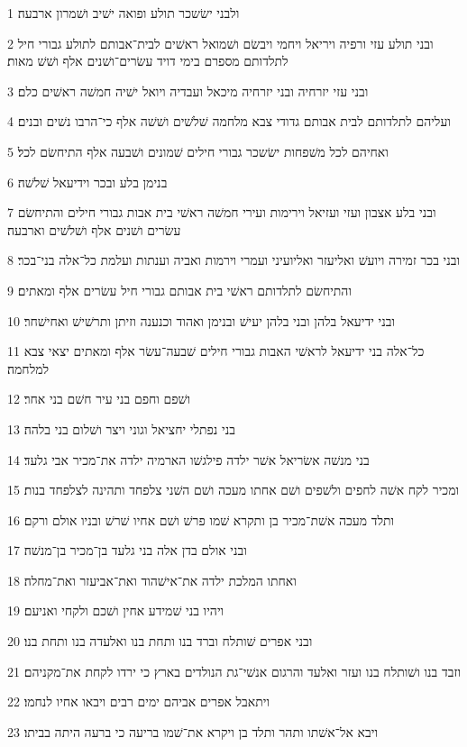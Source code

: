 \par 1 ולבני ישׂשכר תולע ופואה ישׁיב ושׁמרון ארבעה׃
\par 2 ובני תולע עזי ורפיה ויריאל ויחמי ויבשׂם ושׁמואל ראשׁים לבית־אבותם לתולע גבורי חיל לתלדותם מספרם בימי דויד עשׂרים־ושׁנים אלף ושׁשׁ מאות׃
\par 3 ובני עזי יזרחיה ובני יזרחיה מיכאל ועבדיה ויואל ישׁיה חמשׁה ראשׁים כלם׃
\par 4 ועליהם לתלדותם לבית אבותם גדודי צבא מלחמה שׁלשׁים ושׁשׁה אלף כי־הרבו נשׁים ובנים׃
\par 5 ואחיהם לכל משׁפחות ישׂשכר גבורי חילים שׁמונים ושׁבעה אלף התיחשׂם לכל׃
\par 6 בנימן בלע ובכר וידיעאל שׁלשׁה׃
\par 7 ובני בלע אצבון ועזי ועזיאל וירימות ועירי חמשׁה ראשׁי בית אבות גבורי חילים והתיחשׂם עשׂרים ושׁנים אלף ושׁלשׁים וארבעה׃
\par 8 ובני בכר זמירה ויועשׁ ואליעזר ואליועיני ועמרי וירמות ואביה וענתות ועלמת כל־אלה בני־בכר׃
\par 9 והתיחשׂם לתלדותם ראשׁי בית אבותם גבורי חיל עשׂרים אלף ומאתים׃
\par 10 ובני ידיעאל בלהן ובני בלהן יעישׁ ובנימן ואהוד וכנענה וזיתן ותרשׁישׁ ואחישׁחר׃
\par 11 כל־אלה בני ידיעאל לראשׁי האבות גבורי חילים שׁבעה־עשׂר אלף ומאתים יצאי צבא למלחמה׃
\par 12 ושׁפם וחפם בני עיר חשׁם בני אחר׃
\par 13 בני נפתלי יחציאל וגוני ויצר ושׁלום בני בלהה׃
\par 14 בני מנשׁה אשׂריאל אשׁר ילדה פילגשׁו הארמיה ילדה את־מכיר אבי גלעד׃
\par 15 ומכיר לקח אשׁה לחפים ולשׁפים ושׁם אחתו מעכה ושׁם השׁני צלפחד ותהינה לצלפחד בנות׃
\par 16 ותלד מעכה אשׁת־מכיר בן ותקרא שׁמו פרשׁ ושׁם אחיו שׁרשׁ ובניו אולם ורקם׃
\par 17 ובני אולם בדן אלה בני גלעד בן־מכיר בן־מנשׁה׃
\par 18 ואחתו המלכת ילדה את־אישׁהוד ואת־אביעזר ואת־מחלה׃
\par 19 ויהיו בני שׁמידע אחין ושׁכם ולקחי ואניעם׃
\par 20 ובני אפרים שׁותלח וברד בנו ותחת בנו ואלעדה בנו ותחת בנו׃
\par 21 וזבד בנו ושׁותלח בנו ועזר ואלעד והרגום אנשׁי־גת הנולדים בארץ כי ירדו לקחת את־מקניהם׃
\par 22 ויתאבל אפרים אביהם ימים רבים ויבאו אחיו לנחמו׃
\par 23 ויבא אל־אשׁתו ותהר ותלד בן ויקרא את־שׁמו בריעה כי ברעה היתה בביתו׃
